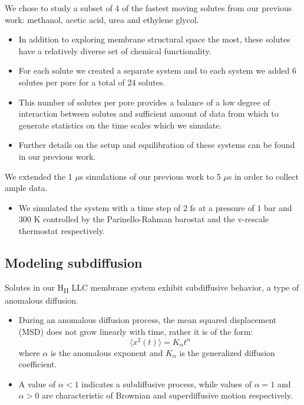 \documentclass{article}
\begin{document}
  We chose to study a subset of 4 of the fastest moving solutes from our previous
  work: methanol, acetic acid, urea and ethylene glycol.
  \begin{itemize} 
    \item In addition to exploring membrane structural space the most, these solutes
    have a relatively diverse set of chemical functionality.   
    \item For each solute we created a separate system and to each system we
    added 6 solutes per pore for a total of 24 solutes.
    \item This number of solutes per pore provides a balance of a low 
    degree of interaction between solutes and sufficient amount of data from
    which to generate statistics on the time scales which we simulate.
    \item Further details on the setup and equilibration of these systems can
    be found in our previous work.\cite{coscia_chemically_2019}
  \end{itemize}
  
  We extended the 1 $\mu$s simulations of our previous work to 5 $\mu$s in order
  to collect ample data.
  \begin{itemize}
    \item We simulated the system with a time step of 2 fs at a pressure of 1 bar
    and 300 K controlled by the Parinello-Rahman barostat and the v-rescale thermostat
    respectively.
  \end{itemize}
  
  \subsection{Modeling subdiffusion}\label{method:model_sFBM}

  Solutes in our H\textsubscript{II} LLC membrane system exhibit subdiffusive
  behavior, a type of anomalous diffusion.
  \begin{itemize}
  	\item During an anomalous diffusion process, the mean squared displacement (MSD)
  	does not grow linearly with time, rather it is of the form:
	\begin{equation} 
	\langle x^2(t) \rangle = K_{\alpha}t^\alpha
	\label{eqn:msd_form}
	\end{equation} 
	where $\alpha$ is the anomalous exponent and $K_\alpha$ is the
	generalized diffusion coefficient.
	\item A value of $\alpha < 1$ indicates a subdiffusive process, while values of
	$\alpha = 1$ and $\alpha > 0$ are characteristic of Brownian and superdiffusive
	motion respectively.
  \end{itemize}
\end{document}
